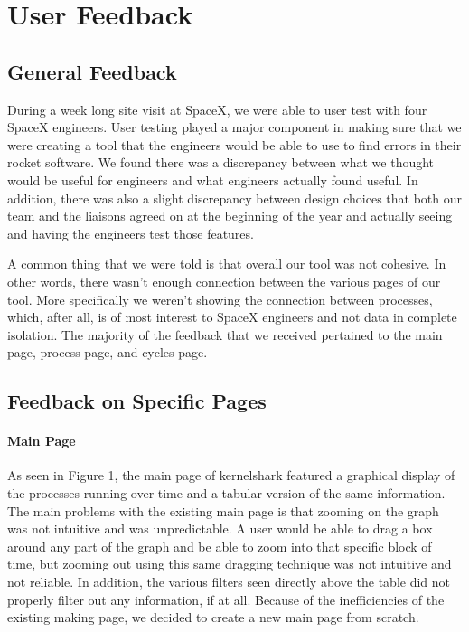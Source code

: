 \documentclass{hmcclinic}
\begin{document}
\chapter{User Feedback} %
\section{General Feedback} %
During a week long site visit at SpaceX, we were able to user test with four SpaceX engineers. User testing played a major component in making sure that we were creating a tool that the engineers would be able to use to find errors in their rocket software. We found there was a discrepancy between what we thought would be useful for engineers and what engineers actually found useful. In addition, there was also a slight discrepancy between design choices that both our team and the liaisons agreed on at the beginning of the year and actually seeing and having the engineers test those features.

A common thing that we were told is that overall our tool was not cohesive. In other words, there wasn't enough connection between the various pages of our tool. More specifically we weren't showing the connection between processes, which, after all, is of most interest to SpaceX engineers and not data in complete isolation. The majority of the feedback that we received pertained to the main page, process page, and cycles page.

\section{Feedback on Specific Pages} %

\subsubsection{Main Page}

As seen in Figure 1, the main page of kernelshark featured a graphical display of the processes running over time and a tabular version of the same information. The main problems with the existing main page is that zooming on the graph was not intuitive and was unpredictable. A user would be able to drag a box around any part of the graph and be able to zoom into that specific block of time, but zooming out using this same dragging technique was not intuitive and not reliable. In addition, the various filters seen directly above the table did not properly filter out any information, if at all. Because of the inefficiencies of the existing making page, we decided to create a new main page from scratch. 
\end{document}
